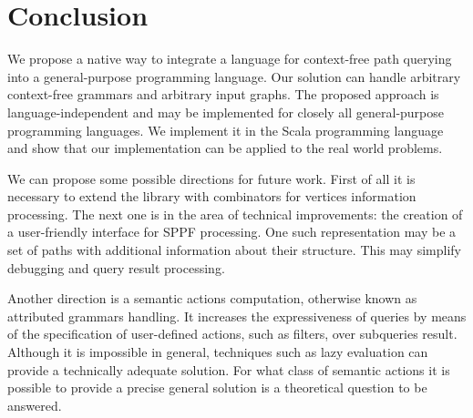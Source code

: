 \section{Conclusion}

We propose a native way to integrate a language for context-free path querying into a general-purpose programming language.
Our solution can handle arbitrary context-free grammars and arbitrary input graphs.
The proposed approach is language-independent and may be implemented for closely all general-purpose programming languages.
We implement it in the Scala programming language and show that our implementation can be applied to the real world problems.

We can propose some possible directions for future work.
First of all it is necessary to extend the library with combinators for vertices information processing.
The next one is in the area of technical improvements: the creation of a user-friendly interface for SPPF processing.
One such representation may be a set of paths with additional information about their structure.
This may simplify debugging and query result processing.

Another direction is a semantic actions computation, otherwise known as attributed grammars handling.
It increases the expressiveness of queries by means of the specification of user-defined actions, such as filters, over subqueries result. 
Although it is impossible in general, techniques such as lazy evaluation can provide a technically adequate solution.
For what class of semantic actions it is possible to provide a precise general solution is a theoretical question to be answered. 

